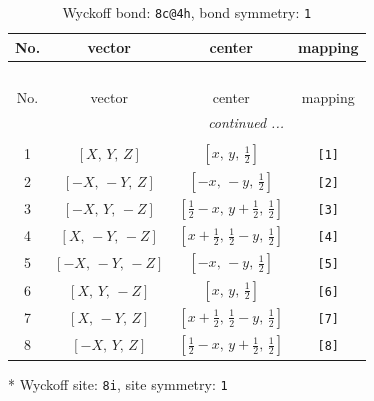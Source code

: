 \documentclass[fleqn,8pt]{jsarticle}
\begin{document}
\renewcommand{\arraystretch}{1.2}
\begin{longtable}{cccc}
\caption{Wyckoff bond: {\tt 8c@4h}, bond symmetry: {\tt 1}}
 \\
 \hline \hline
No. & vector & center & mapping \\ \hline \endfirsthead

\multicolumn{3}{l}{\tablename\ \thetable{}} \\
 \hline \hline
No. & vector & center & mapping \\ \hline \endhead

 \hline \hline
\multicolumn{3}{r}{\footnotesize\it continued ...} \\ \endfoot

 \hline \hline
\multicolumn{3}{r}{} \\ \endlastfoot

1 & $\left[ X,\, Y,\, Z \right]$ & $\left[ x,\, y,\, \frac{1}{2} \right]$ & {\tt [1]} \\ \hline
2 & $\left[ - X,\, - Y,\, Z \right]$ & $\left[ - x,\, - y,\, \frac{1}{2} \right]$ & {\tt [2]} \\ \hline
3 & $\left[ - X,\, Y,\, - Z \right]$ & $\left[ \frac{1}{2} - x,\, y + \frac{1}{2},\, \frac{1}{2} \right]$ & {\tt [3]} \\ \hline
4 & $\left[ X,\, - Y,\, - Z \right]$ & $\left[ x + \frac{1}{2},\, \frac{1}{2} - y,\, \frac{1}{2} \right]$ & {\tt [4]} \\ \hline
5 & $\left[ - X,\, - Y,\, - Z \right]$ & $\left[ - x,\, - y,\, \frac{1}{2} \right]$ & {\tt [5]} \\ \hline
6 & $\left[ X,\, Y,\, - Z \right]$ & $\left[ x,\, y,\, \frac{1}{2} \right]$ & {\tt [6]} \\ \hline
7 & $\left[ X,\, - Y,\, Z \right]$ & $\left[ x + \frac{1}{2},\, \frac{1}{2} - y,\, \frac{1}{2} \right]$ & {\tt [7]} \\ \hline
8 & $\left[ - X,\, Y,\, Z \right]$ & $\left[ \frac{1}{2} - x,\, y + \frac{1}{2},\, \frac{1}{2} \right]$ & {\tt [8]} \\
\end{longtable}
* Wyckoff site: {\tt 8i}, site symmetry: {\tt 1}
\renewcommand{\arraystretch}{1.2}
\end{document}
